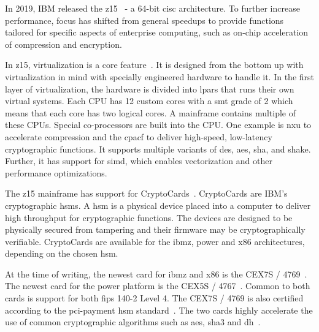 In 2019, IBM released the \gls{z15}~\cite{jacobi2020} - a 64-bit \gls{cisc} architecture. To further increase performance, focus has shifted from general speedups to provide functions tailored for specific aspects of enterprise computing, such as on-chip acceleration of compression and encryption.

In \gls{z15}, virtualization is a core feature~\cite{redbook:z15}. It is designed from the bottom up with virtualization in mind with specially engineered hardware to handle it. In the first layer of virtualization, the hardware is divided into \glspl{lpar} that runs their own virtual systems. Each CPU has 12 custom cores with a \gls{smt} grade of 2 which means that each core has two logical cores. A mainframe contains multiple of these CPUs. Special co-processors are built into the CPU. One example is \gls{nxu} to accelerate compression and the \gls{cpacf} to deliver high-speed, low-latency cryptographic functions. It supports multiple variants of \gls{des}, \gls{aes}, \gls{sha}, and \gls{shake}. Further, it has support for \gls{simd}, which enables vectorization and other performance optimizations.

The \gls{z15} mainframe has support for CryptoCards~\cite{ibm:hsms}. CryptoCards are IBM's cryptographic \glspl{hsm}. A \gls{hsm} is a physical device placed into a computer to deliver high throughput for cryptographic functions. The devices are designed to be physically secured from tampering and their firmware may be cryptographically verifiable. CryptoCards are available for the \gls{ibmz}, \gls{power} and \gls{x86} architectures, depending on the chosen \gls{hsm}.

At the time of writing, the newest card for \gls{ibmz} and \gls{x86} is the CEX7S / 4769~\cite{ibm:4769}. The newest card for the \gls{power} platform is the CEX5S / 4767~\cite{ibm:4767}. Common to both cards is support for both \gls{fips} 140-2 Level 4. The CEX7S / 4769 is also certified according to the \gls{pci-payment} \gls{hsm} standard~\cite{ibm:4769,ibm:4767}. The two cards highly accelerate the use of common cryptographic algorithms such as \gls{aes}, \gls{sha3} and \gls{dh}~\cite{ibm:4767,ibm:4769}.